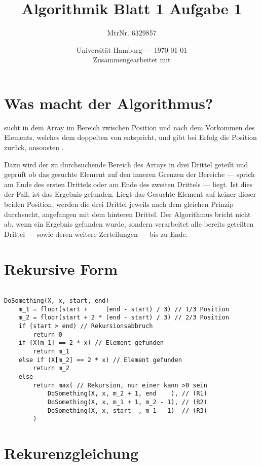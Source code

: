 \documentclass[parskip=half,a4paper]{scrartcl}
\title{Algorithmik Blatt 1 Aufgabe 1} %
\author{MtrNr. 6329857} %
\date{Universität Hamburg --- \today \\ Zusammengearbeitet mit} %
\begin{document}
\maketitle %

\section*{Was macht der Algorithmus?}

 sucht in dem Array  im Bereich zwischen Position
 und  nach dem Vorkommen des Elements, welches dem doppelten von 
entspricht, und gibt bei Erfolg die Position zurück, ansonsten .

Dazu wird der zu durchsuchende Bereich des Arrays in drei Drittel geteilt und geprüft ob das gesuchte Element auf den inneren Grenzen der Bereiche --- sprich am Ende des ersten Drittels oder am Ende des zweiten Drittels --- liegt. Ist dies der Fall, ist das Ergebnis gefunden. Liegt das Gesuchte Element auf keiner dieser beiden Position, werden die drei Drittel jeweils nach dem gleichen Prinzip durchsucht, angefangen mit dem hinteren Drittel. Der Algorithmus bricht nicht ab, wenn ein Ergebnis gefunden wurde, sondern verarbeitet alle bereits geteilten Drittel --- sowie deren weitere Zerteilungen --- bis zu Ende.

\section*{Rekursive Form}

\begin{verbatim}

DoSomething(X, x, start, end)
    m_1 = floor(start +     (end - start) / 3) // 1/3 Position
    m_2 = floor(start + 2 * (end - start) / 3) // 2/3 Position
    if (start > end) // Rekursionsabbruch
        return 0
    if (X[m_1] == 2 * x) // Element gefunden
        return m_1
    else if (X[m_2] == 2 * x) // Element gefunden
        return m_2
    else
        return max( // Rekursion, nur einer kann >0 sein
            DoSomething(X, x, m_2 + 1, end    ), // (R1)
            DoSomething(X, x, m_1 + 1, m_2 - 1), // (R2)
            DoSomething(X, x, start  , m_1 - 1)  // (R3)
        )

\end{verbatim}

\section*{Rekurenzgleichung}
\end{document}
